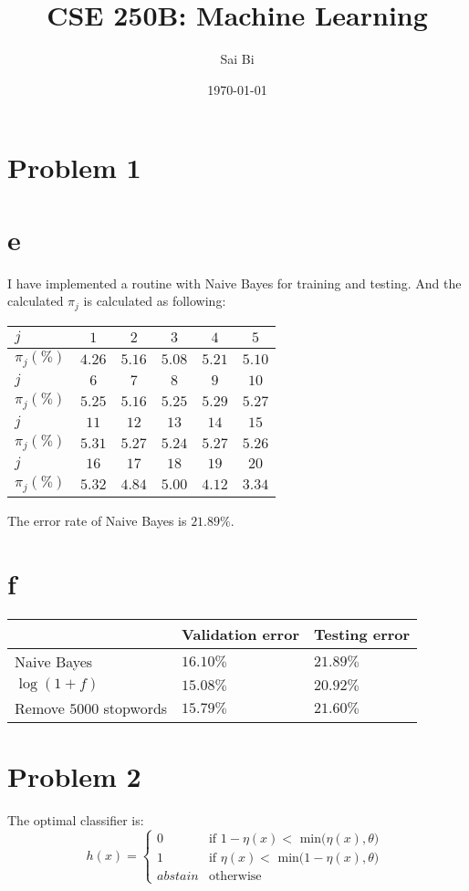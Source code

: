 \documentclass[a4paper,11pt]{article}
\theoremstyle{mytheor}
\begin{document}
\title{CSE 250B: Machine Learning}

\author{Sai Bi}

\date{\today}

\maketitle

\section*{Problem 1}

\section*{e}
I have implemented a routine with Naive Bayes for training and testing. And the calculated   $\pi_j$ is calculated as following:

\begin{center}
\begin{tabular}{|l|c|c|c|c|c|}
	\hline
	$j$ &$1$ &$2$ & $3$& $4$&  $5$ \\ \hline
	$\pi_j (\%)$ & $ 4.26$ & $ 5.16$ & $ 5.08$ & $ 5.21$ & $ 5.10$    \\ \hline
	
	$j$ & $6$ & $7$ & $8$& $9$&$10$  \\ \hline
	$\pi_j (\%)$ & $ 5.25$ & $ 5.16$ & $ 5.25$ & $ 5.29$ & $ 5.27$   \\ \hline
	
	$j$ & $11$& $12$& $13$&$14$ &  $15$\\ \hline
	$\pi_j (\%)$ & $ 5.31$ & $ 5.27$ & $ 5.24$ & $ 5.27$ & $ 5.26$  \\ \hline
	
	$j$ & $16$& $17$&$18$ & $19$&  $20$\\ \hline
	$\pi_j (\%)$ & $ 5.32$ & $ 4.84$ & $ 5.00$ & $ 4.12$ & $ 3.34$ \\ \hline
	
\end{tabular}
\end{center}

The error rate of Naive Bayes is $21.89\%$.

\section*{f}
\begin{tabular}{|l|l|l|}
	\hline 
	& Validation error &  Testing error   \\ \hline
	Naive Bayes	& $16.10\%$ & $21.89\%$  \\ \hline 
	$\log(1+f)$ & $15.08\%$ & $20.92\%$  \\ \hline
	Remove $5000$ stopwords & $15.79\%$ & $21.60\%$ \\ \hline 
\end{tabular}


\section*{Problem 2}
The optimal classifier is:
\begin{equation}
h(x) = \left\{ \begin{array}{ll}
0 & \mbox{if $1-\eta(x) < $ min($\eta(x), \theta$)  }\\
1 & \mbox{if $\eta(x) < $ min($1-\eta(x), \theta$)  }\\
abstain & \mbox{otherwise}
\end{array} 
\right.
\end{equation}
\end{document}
